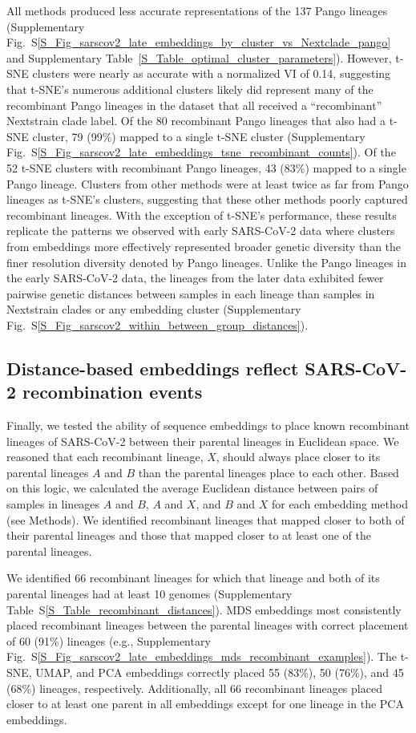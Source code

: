 \documentclass[webpdf,contemporary,large,single]{oup-authoring-template}%
\theoremstyle{thmstyleone}%
\theoremstyle{thmstyletwo}%
\theoremstyle{thmstylethree}%
\begin{document}
All methods produced less accurate representations of the 137 Pango lineages (Supplementary Fig.~S\ref{S_Fig_sarscov2_late_embeddings_by_cluster_vs_Nextclade_pango} and Supplementary Table~\ref{S_Table_optimal_cluster_parameters}).
However, t-SNE clusters were nearly as accurate with a normalized VI of 0.14, suggesting that t-SNE's numerous additional clusters likely did represent many of the recombinant Pango lineages in the dataset that all received a ``recombinant'' Nextstrain clade label.
Of the 80 recombinant Pango lineages that also had a t-SNE cluster, 79 (99\%) mapped to a single t-SNE cluster (Supplementary Fig.~S\ref{S_Fig_sarscov2_late_embeddings_tsne_recombinant_counts}).
Of the 52 t-SNE clusters with recombinant Pango lineages, 43 (83\%) mapped to a single Pango lineage.
Clusters from other methods were at least twice as far from Pango lineages as t-SNE's clusters, suggesting that these other methods poorly captured recombinant lineages.
With the exception of t-SNE's performance, these results replicate the patterns we observed with early SARS-CoV-2 data where clusters from embeddings more effectively represented broader genetic diversity than the finer resolution diversity denoted by Pango lineages.
Unlike the Pango lineages in the early SARS-CoV-2 data, the lineages from the later data exhibited fewer pairwise genetic distances between samples in each lineage than samples in Nextstrain clades or any embedding cluster (Supplementary Fig.~S\ref{S_Fig_sarscov2_within_between_group_distances}).

\subsection{Distance-based embeddings reflect SARS-CoV-2 recombination events}

Finally, we tested the ability of sequence embeddings to place known recombinant lineages of SARS-CoV-2 between their parental lineages in Euclidean space.
We reasoned that each recombinant lineage, $X$, should always place closer to its parental lineages $A$ and $B$ than the parental lineages place to each other.
Based on this logic, we calculated the average Euclidean distance between pairs of samples in lineages $A$ and $B$, $A$ and $X$, and $B$ and $X$ for each embedding method (see Methods).
We identified recombinant lineages that mapped closer to both of their parental lineages and those that mapped closer to at least one of the parental lineages.

We identified 66 recombinant lineages for which that lineage and both of its parental lineages had at least 10 genomes (Supplementary Table~S\ref{S_Table_recombinant_distances}).
MDS embeddings most consistently placed recombinant lineages between the parental lineages with correct placement of 60 (91\%) lineages (e.g., Supplementary Fig.~S\ref{S_Fig_sarscov2_late_embeddings_mds_recombinant_examples}).
The t-SNE, UMAP, and PCA embeddings correctly placed 55 (83\%), 50 (76\%), and 45 (68\%) lineages, respectively.
Additionally, all 66 recombinant lineages placed closer to at least one parent in all embeddings except for one lineage in the PCA embeddings.
\end{document}

